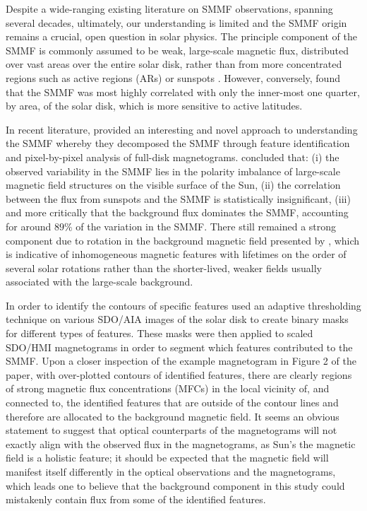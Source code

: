 Despite a wide-ranging existing literature on SMMF observations, spanning several decades, ultimately, our understanding is limited and the SMMF origin remains a crucial, open question in solar physics. The principle component of the SMMF is commonly assumed to be weak, large-scale magnetic flux, distributed over vast areas over the entire solar disk, rather than from more concentrated regions such as active regions (ARs) or sunspots \citep{severny_time_1971, scherrer_mean_1977, xiang_ensemble_2016}. However, conversely, \citet{scherrer_mean_1972} found that the SMMF was most highly correlated with only the inner-most one quarter, by area, of the solar disk, which is more sensitive to active latitudes.

In recent literature, \citet{bose_variability_2018} provided an interesting and novel approach to understanding the SMMF whereby they decomposed the SMMF through feature identification and pixel-by-pixel analysis of full-disk magnetograms. \citet{bose_variability_2018} concluded that: (i) the observed variability in the SMMF lies in the polarity imbalance of large-scale magnetic field structures on the visible surface of the Sun, (ii) the correlation between the flux from sunspots and the SMMF is statistically insignificant, (iii) and more critically that the background flux dominates the SMMF, accounting for around $89 \%$ of the variation in the SMMF. There still remained a strong component due to rotation in the background magnetic field presented by \citet{bose_variability_2018}, which is indicative of inhomogeneous magnetic features with lifetimes on the order of several solar rotations rather than the shorter-lived, weaker fields usually associated with the large-scale background. 

In order to identify the contours of specific features \citet{bose_variability_2018} used an adaptive thresholding technique on various SDO/AIA images of the solar disk to create binary masks for different types of features. These masks were then applied to scaled SDO/HMI magnetograms in order to segment which features contributed to the SMMF. Upon a closer inspection of the example magnetogram in Figure 2 of the paper, with over-plotted contours of identified features, there are clearly regions of strong magnetic flux concentrations (MFCs) in the local vicinity of, and connected to, the identified features that are outside of the contour lines and therefore are allocated to the background magnetic field. It seems an obvious statement to suggest that optical counterparts of the magnetograms will not exactly align with the observed flux in the magnetograms, as Sun's the magnetic field is a holistic feature; it should be expected that the magnetic field will manifest itself differently in the optical observations and the magnetograms, which leads one to believe that the background component in this study could mistakenly contain flux from some of the identified features.

